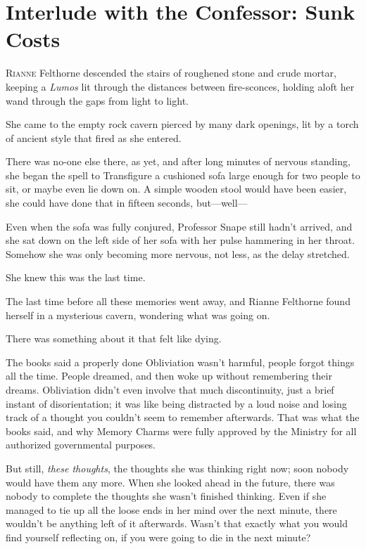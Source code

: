 \chapter{Interlude with the Confessor: Sunk Costs}

\lettrine{R}{ianne} Felthorne descended the stairs of roughened stone and crude mortar, keeping a \emph{Lumos} lit through the distances between fire-sconces, holding aloft her wand through the gaps from light to light.

She came to the empty rock cavern pierced by many dark openings, lit by a torch of ancient style that fired as she entered.

There was no-one else there, as yet, and after long minutes of nervous standing, she began the spell to Transfigure a cushioned sofa large enough for two people to sit, or maybe even lie down on. A simple wooden stool would have been easier, she could have done that in fifteen seconds, but—well—

Even when the sofa was fully conjured, Professor Snape still hadn't arrived, and she sat down on the left side of her sofa with her pulse hammering in her throat. Somehow she was only becoming more nervous, not less, as the delay stretched.

She knew this was the last time.

The last time before all these memories went away, and Rianne Felthorne found herself in a mysterious cavern, wondering what was going on.

There was something about it that felt like dying.

The books said a properly done Obliviation wasn't harmful, people forgot things all the time. People dreamed, and then woke up without remembering their dreams. Obliviation didn't even involve that much discontinuity, just a brief instant of disorientation; it was like being distracted by a loud noise and losing track of a thought you couldn't seem to remember afterwards. That was what the books said, and why Memory Charms were fully approved by the Ministry for all authorized governmental purposes.

But still, \emph{these thoughts}, the thoughts she was thinking right now; soon nobody would have them any more. When she looked ahead in the future, there was nobody to complete the thoughts she wasn't finished thinking. Even if she managed to tie up all the loose ends in her mind over the next minute, there wouldn't be anything left of it afterwards. Wasn't that exactly what you would find yourself reflecting on, if you were going to die in the next minute?

